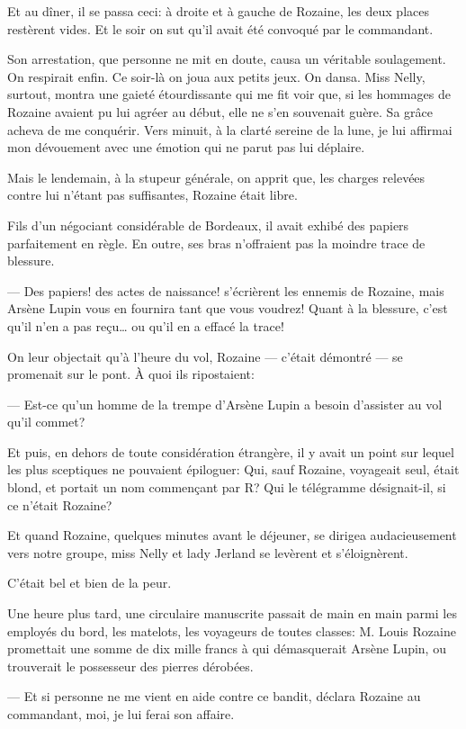 \documentclass[12pt,a4paper]{book}
\begin{document}
Et au dîner, il se passa ceci: à droite et à gauche de Rozaine, les deux places restèrent vides. Et le soir on sut qu’il avait été convoqué par le commandant.

Son arrestation, que personne ne mit en doute, causa un véritable soulagement. On respirait enfin. Ce soir-là on joua aux petits jeux. On dansa. Miss Nelly, surtout, montra une gaieté étourdissante qui me fit voir que, si les hommages de Rozaine avaient pu lui agréer au début, elle ne s’en souvenait guère. Sa grâce acheva de me conquérir. Vers minuit, à la clarté sereine de la lune, je lui affirmai mon dévouement avec une émotion qui ne parut pas lui déplaire.

Mais le lendemain, à la stupeur générale, on apprit que, les charges relevées contre lui n’étant pas suffisantes, Rozaine était libre.

Fils d’un négociant considérable de Bordeaux, il avait exhibé des papiers parfaitement en règle. En outre, ses bras n’offraient pas la moindre trace de blessure.

— Des papiers! des actes de naissance! s’écrièrent les ennemis de Rozaine, mais Arsène Lupin vous en fournira tant que vous voudrez! Quant à la blessure, c’est qu’il n’en a pas reçu… ou qu’il en a effacé la trace!

On leur objectait qu’à l’heure du vol, Rozaine — c’était démontré — se promenait sur le pont. À quoi ils ripostaient:

— Est-ce qu’un homme de la trempe d’Arsène Lupin a besoin d’assister au vol qu’il commet?

Et puis, en dehors de toute considération étrangère, il y avait un point sur lequel les plus sceptiques ne pouvaient épiloguer: Qui, sauf Rozaine, voyageait seul, était blond, et portait un nom commençant par R? Qui le télégramme désignait-il, si ce n’était Rozaine?

Et quand Rozaine, quelques minutes avant le déjeuner, se dirigea audacieusement vers notre groupe, miss Nelly et lady Jerland se levèrent et s’éloignèrent.

C’était bel et bien de la peur.

Une heure plus tard, une circulaire manuscrite passait de main en main parmi les employés du bord, les matelots, les voyageurs de toutes classes: M. Louis Rozaine promettait une somme de dix mille francs à qui démasquerait Arsène Lupin, ou trouverait le possesseur des pierres dérobées.

— Et si personne ne me vient en aide contre ce bandit, déclara Rozaine au commandant, moi, je lui ferai son affaire. 
\end{document}
